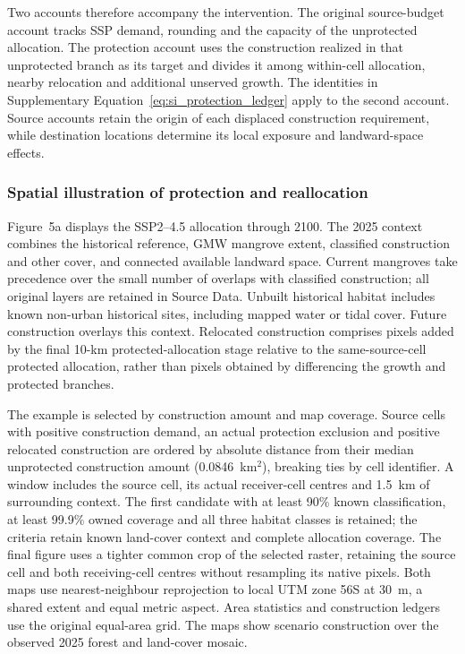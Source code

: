 Two accounts therefore accompany the intervention. The original source-budget account tracks SSP demand, rounding and the capacity of the unprotected allocation. The protection account uses the construction realized in that unprotected branch as its target and divides it among within-cell allocation, nearby relocation and additional unserved growth. The identities in Supplementary Equation~\eqref{eq:si_protection_ledger} apply to the second account. Source accounts retain the origin of each displaced construction requirement, while destination locations determine its local exposure and landward-space effects.


\subsubsection{Spatial illustration of protection and reallocation}
Figure~5a displays the SSP2--4.5 allocation through 2100. The 2025 context combines the historical reference, GMW mangrove extent, classified construction and other cover, and connected available landward space. Current mangroves take precedence over the small number of overlaps with classified construction; all original layers are retained in Source Data. Unbuilt historical habitat includes known non-urban historical sites, including mapped water or tidal cover. Future construction overlays this context. Relocated construction comprises pixels added by the final 10-km protected-allocation stage relative to the same-source-cell protected allocation, rather than pixels obtained by differencing the growth and protected branches.

The example is selected by construction amount and map coverage. Source cells with positive construction demand, an actual protection exclusion and positive relocated construction are ordered by absolute distance from their median unprotected construction amount (0.0846~km$^2$), breaking ties by cell identifier. A window includes the source cell, its actual receiver-cell centres and 1.5~km of surrounding context. The first candidate with at least 90\% known classification, at least 99.9\% owned coverage and all three habitat classes is retained; the criteria retain known land-cover context and complete allocation coverage. The final figure uses a tighter common crop of the selected raster, retaining the source cell and both receiving-cell centres without resampling its native pixels. Both maps use nearest-neighbour reprojection to local UTM zone 56S at 30~m, a shared extent and equal metric aspect. Area statistics and construction ledgers use the original equal-area grid. The maps show scenario construction over the observed 2025 forest and land-cover mosaic.

